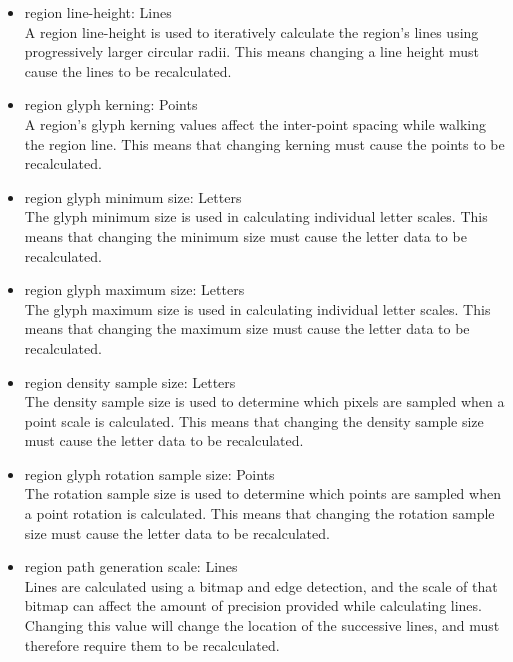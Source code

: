 \begin{itemize}
  \item region line-height: Lines \\
        A region line-height is used to iteratively calculate the region's lines using progressively larger circular radii.
        This means changing a line height must cause the lines to be recalculated.

  \item region glyph kerning: Points \\
        A region's glyph kerning values affect the inter-point spacing while walking the region line.
        This means that changing kerning must cause the points to be recalculated.

  \item region glyph minimum size: Letters \\
        The glyph minimum size is used in calculating individual letter scales.
        This means that changing the minimum size must cause the letter data to be recalculated.

  \item region glyph maximum size: Letters \\
        The glyph maximum size is used in calculating individual letter scales.
        This means that changing the maximum size must cause the letter data to be recalculated.

  \item region density sample size: Letters \\
        The density sample size is used to determine which pixels are sampled when a point scale is calculated.
        This means that changing the density sample size must cause the letter data to be recalculated.

  \item region glyph rotation sample size: Points \\
        The rotation sample size is used to determine which points are sampled when a point rotation is calculated.
        This means that changing the rotation sample size must cause the letter data to be recalculated.

  \item region path generation scale: Lines \\
        Lines are calculated using a bitmap and edge detection, and the scale of that bitmap can affect the amount of precision provided while calculating lines.
        Changing this value will change the location of the successive lines, and must therefore require them to be recalculated.
\end{itemize}

